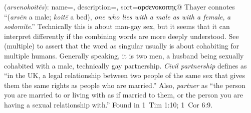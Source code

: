 \item[Gay-partner,]

(\textit{arsenokoitēs}):
{
    name=,
    description={},
    sort=αρσενοκοιτης@
}
Thayer connotes ``(\emph{arsēn} a male; \emph{koitē} a bed), \emph{one who lies with a male as with a female}, \emph{a sodomite}.'' Technically this is about man-gay sex, but it seems that it can interpret differently if the combining words are more deeply understood. See  (multiple) to assert that the word  as singular usually is about cohabiting for multiple humans. Generally speaking, it is two men, a husband being sexually cohabited with a male, technically gay partnership. \emph{Civil partnership} defines as ``in the UK, a legal relationship between two people of the same sex that gives them the same rights as people who are married.'' Also, \emph{partner} as ``the person you are married to or living with as if married to them, or the person you are having a sexual relationship with.''
Found in 1~Tim 1:10; 1~Cor 6:9.
